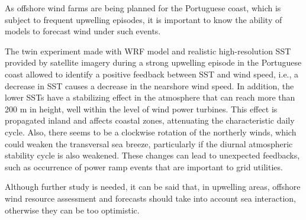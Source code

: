 As offshore wind farms are being planned for the Portuguese coast, which is subject to frequent upwelling episodes, it is important to know the ability of models to forecast wind under such events. 

The twin experiment made with WRF model and realistic high-resolution SST provided by satellite imagery during a strong upwelling episode in the Portuguese coast allowed to identify a positive feedback between SST and wind speed, i.e., a decrease in SST causes a decrease in the nearshore wind speed. In addition, the lower SSTs have a stabilizing effect in the atmosphere that can reach more than 200 m in height, well within the level of wind power turbines. This effect is propagated inland and affects coastal zones, attenuating the characteristic daily cycle. Also, there seems to be a clockwise rotation of the northerly winds, which could weaken the transversal sea breeze, particularly if the diurnal atmospheric stability cycle is also weakened. These changes can lead to unexpected feedbacks, such as occurrence of power ramp events that are important to grid utilities. 

Although further study is needed, it can be said that, in upwelling areas, offshore wind resource assessment and forecasts should take into account sea interaction, otherwise they can be too optimistic.



